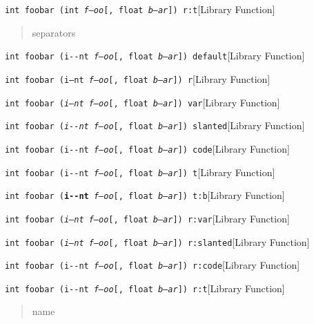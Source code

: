 \documentclass{book}
\newcommand\GNUTexinfocommandstyletextvar[1]{{\normalfont{}\textsl{#1}}}%
\begin{document}
%
\noindent\texttt{int foobar (int \GNUTexinfocommandstyletextvar{f---oo}\textnormal{\texttt{[}}, float \GNUTexinfocommandstyletextvar{b--ar}\textnormal{\texttt{]}}) r:t}\hfill[Library Function]

%
\begin{quote}
\unskip{\parskip=0pt\noindent}%
separators
\end{quote}

\noindent\texttt{int foobar (i{-}{-}nt \GNUTexinfocommandstyletextvar{f---oo}[, float \GNUTexinfocommandstyletextvar{b--ar}]) default}\hfill[Library Function]

%
\noindent\texttt{int foobar (\textnormal{i--nt} \GNUTexinfocommandstyletextvar{f---oo}[, float \GNUTexinfocommandstyletextvar{b--ar}]) r}\hfill[Library Function]

%
\noindent\texttt{int foobar (\GNUTexinfocommandstyletextvar{i--nt} \GNUTexinfocommandstyletextvar{f---oo}[, float \GNUTexinfocommandstyletextvar{b--ar}]) var}\hfill[Library Function]

%
\noindent\texttt{int foobar (\textsl{i{-}{-}nt} \GNUTexinfocommandstyletextvar{f---oo}[, float \GNUTexinfocommandstyletextvar{b--ar}]) slanted}\hfill[Library Function]

%
\noindent\texttt{int foobar (\texttt{i{-}{-}nt} \GNUTexinfocommandstyletextvar{f---oo}[, float \GNUTexinfocommandstyletextvar{b--ar}]) code}\hfill[Library Function]

%
\noindent\texttt{int foobar (\texttt{i{-}{-}nt} \GNUTexinfocommandstyletextvar{f---oo}[, float \GNUTexinfocommandstyletextvar{b--ar}]) t}\hfill[Library Function]

%
\noindent\texttt{int foobar (\texttt{\textbf{i{-}{-}nt}} \GNUTexinfocommandstyletextvar{f---oo}[, float \GNUTexinfocommandstyletextvar{b--ar}]) t:b}\hfill[Library Function]

%
\noindent\texttt{int foobar (\textnormal{\GNUTexinfocommandstyletextvar{i--nt}} \GNUTexinfocommandstyletextvar{f---oo}[, float \GNUTexinfocommandstyletextvar{b--ar}]) r:var}\hfill[Library Function]

%
\noindent\texttt{int foobar (\textnormal{\textsl{i--nt}} \GNUTexinfocommandstyletextvar{f---oo}[, float \GNUTexinfocommandstyletextvar{b--ar}]) r:slanted}\hfill[Library Function]

%
\noindent\texttt{int foobar (\textnormal{\texttt{i{-}{-}nt}} \GNUTexinfocommandstyletextvar{f---oo}[, float \GNUTexinfocommandstyletextvar{b--ar}]) r:code}\hfill[Library Function]

%
\noindent\texttt{int foobar (\textnormal{\texttt{i{-}{-}nt}} \GNUTexinfocommandstyletextvar{f---oo}[, float \GNUTexinfocommandstyletextvar{b--ar}]) r:t}\hfill[Library Function]

%
\begin{quote}
\unskip{\parskip=0pt\noindent}%
name
\end{quote}
\end{document}
